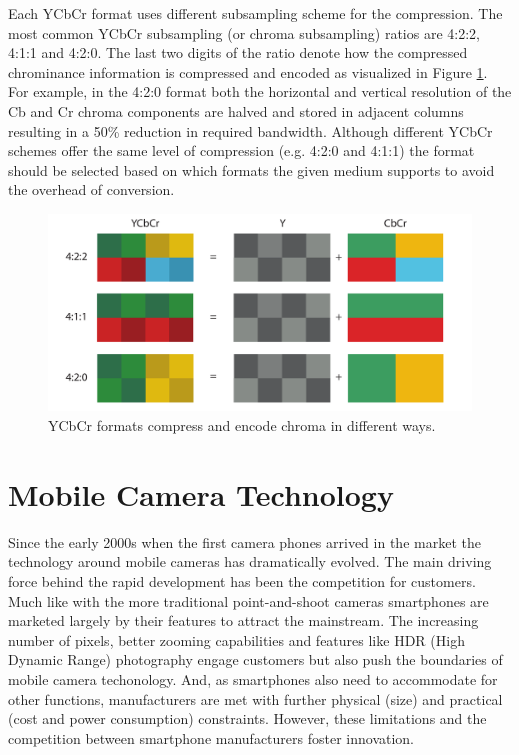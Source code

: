 \documentclass[thesis.tex]{subfiles}
\begin{document}
Each YCbCr format uses different subsampling scheme for the compression. The most common YCbCr subsampling (or chroma subsampling) ratios are 4:2:2, 4:1:1 and 4:2:0. The last two digits of the ratio denote how the compressed chrominance information is compressed and encoded as visualized in Figure \ref{figure:ycbcr}. For example, in the 4:2:0 format both the horizontal and vertical resolution of the Cb and Cr chroma components are halved and stored in adjacent columns resulting in a 50\% reduction in required bandwidth. Although different YCbCr schemes offer the same level of compression (e.g. 4:2:0 and 4:1:1) the format should be selected based on which formats the given medium supports to avoid the overhead of conversion.

\begin{figure}[ht]
\centering \includegraphics[width=\textwidth]{images/ycbcr}
\caption{YCbCr formats compress and encode chroma in different ways.\label{figure:ycbcr}}
\end{figure}


\section{Mobile Camera Technology}
Since the early 2000s when the first camera phones arrived in the market the technology around mobile cameras has dramatically evolved. The main driving force behind the rapid development has been the competition for customers. Much like with the more traditional point-and-shoot cameras smartphones are marketed largely by their features to attract the mainstream. The increasing number of pixels, better zooming capabilities and features like HDR (High Dynamic Range) photography engage customers but also push the boundaries of mobile camera techonology. And, as smartphones also need to accommodate for other functions, manufacturers are met with further physical (size) and practical (cost and power consumption) constraints. However, these limitations and the competition between smartphone manufacturers foster innovation.
\end{document}
